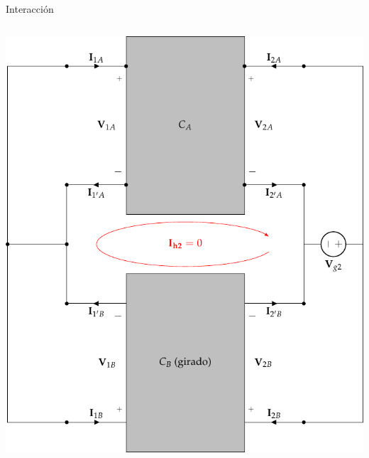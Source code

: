 \documentclass[aspectratio=169, usenames,svgnames,dvipsnames]{beamer}
\begin{document}
\begin{frame}[label={sec:orgb5934a5},plain]{Interacción}
\begin{columns}
\begin{column}{0.5\columnwidth}
\begin{center}
\includegraphics[height=0.8\textheight]{../figs/paralelo-paralelo-superposicion-salida.pdf}
\end{center}
\end{column}
\end{columns}
\end{frame}
\end{document}
